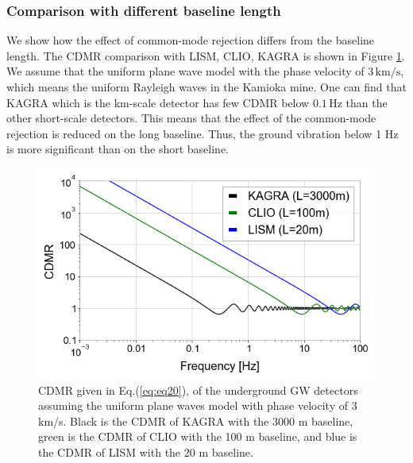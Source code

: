 \subsubsection{Comparison with different baseline length}
We show how the effect of common-mode rejection differs from the baseline length. The CDMR comparison with LISM, CLIO, KAGRA is shown in Figure \ref{img:img301}. We assume that the uniform plane wave model with the phase velocity of $3\,\mathrm{km/s}$, which means the uniform Rayleigh waves in the Kamioka mine. One can find that KAGRA which is the km-scale detector has few CDMR below $0.1\,\mathrm{Hz}$ than the other short-scale detectors. This means that the effect of the common-mode rejection is reduced on the long baseline. Thus, the ground vibration below 1 Hz is more significant than on the short baseline. 

\begin{figure}[h]
  \begin{center}
    \centering
    \includegraphics[width=12cm]{./img_chap3/img329.png}
    \caption{CDMR given in Eq.(\ref{eq:eq20}), of the underground GW detectors assuming the uniform plane waves model with phase velocity of 3 km/s. Black is the CDMR of KAGRA with the 3000 m baseline, green is the CDMR of CLIO with the 100 m baseline, and blue is the CDMR of LISM with the 20 m baseline.}\label{img:img301}
    \centering      
  \end{center}
\end{figure}


